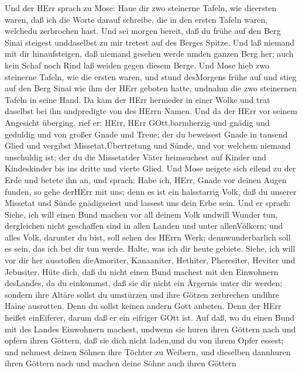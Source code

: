  Und der HErr sprach zu Mose: Haue dir zwo steinerne Tafeln,
wie dieersten waren, daß ich die Worte darauf schreibe, die in den
ersten Tafeln waren, welchedu zerbrochen hast.  Und sei
morgen bereit, daß du frühe auf den Berg Sinai steigest unddaselbst zu
mir tretest auf des Berges Spitze.  Und laß niemand mit dir
hinaufsteigen, daß niemand gesehen werde umden ganzen Berg her; auch
kein Schaf noch Rind laß weiden gegen diesem Berge.  Und
Mose hieb zwo steinerne Tafeln, wie die ersten waren, und stund
desMorgens frühe auf und stieg auf den Berg Sinai wie ihm der HErr
geboten hatte, undnahm die zwo steinernen Tafeln in seine Hand.
 Da kam der HErr hernieder in einer Wolke und trat daselbst
bei ihn undpredigte von des HErrn Namen.  Und da der HErr
vor seinem Angesicht überging, rief er: HErr, HErr GOtt,barmherzig und
gnädig und geduldig und von großer Gnade und Treue;  der du
beweisest Gnade in tausend Glied und vergibst Missetat,Übertretung und
Sünde, und vor welchem niemand unschuldig ist; der du die Missetatder
Väter heimsuchest auf Kinder und Kindeskinder bis ins dritte und vierte
Glied.  Und Mose neigete sich eilend zu der Erde und betete
ihn an,  und sprach: Habe ich, HErr, Gnade vor deinen Augen
funden, so gehe derHErr mit uns; denn es ist ein halsstarrig Volk, daß
du unserer Missetat und Sünde gnädigseiest und lassest uns dein Erbe
sein.  Und er sprach: Siehe, ich will einen Bund machen vor
all deinem Volk undwill Wunder tun, dergleichen nicht geschaffen sind in
allen Landen und unter allenVölkern; und alles Volk, darunter du bist,
soll sehen des HErrn Werk; dennwunderbarlich soll es sein, das ich bei
dir tun werde.  Halte, was ich dir heute gebiete. Siehe,
ich will vor dir her ausstoßen dieAmoriter, Kanaaniter, Hethiter,
Pheresiter, Heviter und Jebusiter.  Hüte dich, daß du nicht
einen Bund machest mit den Einwohnern desLandes, da du einkommst, daß
sie dir nicht ein Ärgernis unter dir werden;  sondern ihre
Altäre sollst du umstürzen und ihre Götzen zerbrechen undihre Haine
ausrotten.  Denn du sollst keinen andern Gott anbeten. Denn
der HErr heißet einEiferer, darum daß er ein eifriger GOtt ist.
 Auf daß, wo du einen Bund mit des Landes Einwohnern
machest, undwenn sie huren ihren Göttern nach und opfern ihren Göttern,
daß sie dich nicht laden,und du von ihrem Opfer essest; 
und nehmest deinen Söhnen ihre Töchter zu Weibern, und dieselben
dannhuren ihren Göttern nach und machen deine Söhne auch ihren Göttern
